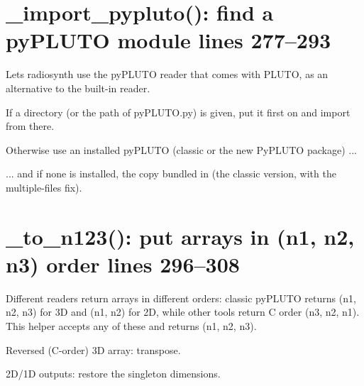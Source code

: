 \section*{\normalsize \_import\_pypluto(): find a pyPLUTO module \hfill{\small\mdseries\color{gray}lines 277--293}}

Lets radiosynth use the pyPLUTO reader that comes with PLUTO, as an alternative to the built-in reader.

\begin{lines}
\item[L.283–289] If a directory (or the path of pyPLUTO.py) is given, put it first on  and import from there.
\item[L.290–291] Otherwise use an installed pyPLUTO (classic or the new PyPLUTO package) ...
\item[L.292] ... and if none is installed, the copy bundled in  (the classic  version, with the multiple-files fix).
\end{lines}
\section*{\normalsize \_to\_n123(): put arrays in (n1, n2, n3) order \hfill{\small\mdseries\color{gray}lines 296--308}}

Different readers return arrays in different orders: classic pyPLUTO returns (n1, n2, n3) for 3D and (n1, n2) for 2D, while other tools return C order (n3, n2, n1). This helper accepts any of these and returns (n1, n2, n3).

\begin{lines}
\item[L.301] Reversed (C-order) 3D array: transpose.
\item[L.303–307] 2D/1D outputs: restore the singleton dimensions.
\end{lines}
